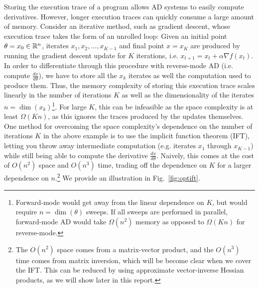 \documentclass[11pt]{article}
\begin{document}
Storing the execution trace of a program allows AD systems to easily compute derivatives.
However, longer execution traces can quickly consume a large amount of memory.
Consider an iterative method, such as gradient descent,
whose execution trace takes the form of an unrolled loop:
Given an initial point $\theta = x_0\in\mathbb{R}^n$,
iterates $x_1, x_2, ..., x_{K-1}$ and final point $x=x_K$
are produced by running the gradient descent
update for $K$ iterations, i.e. $x_{t+1} = x_{t} + \alpha \nabla f(x_t)$.
In order to differentiate through this procedure with reverse-mode AD
(i.e. compute $\frac{dx}{d\theta}$),
we have to store all the $x_k$ iterates
as well the computation used to produce them.
Thus, the memory complexity of storing this execution trace scales linearly in the
number of iterations $K$ as well as the dimensionality of the iterates $n=\dim(x_k)$\footnote{
Forward-mode would get away from the linear dependence on $K$,
but would require $n=\dim(\theta)$ sweeps.
If all sweeps are performed in parallel,
forward-mode AD would take $\Omega(n^2)$ memory as opposed to $\Omega(Kn)$ for reverse-mode.
}.
For large $K$, this can be infeasible as the space complexity is at least $\Omega(Kn)$,
as this ignores the traces produced by the updates themselves.
One method for overcoming the space complexity's dependence on the number of iterations $K$ in
the above example is to use the implicit function theorem (IFT),
letting you throw away intermediate computation (e.g. iterates $x_1$ through $x_{K-1}$)
while still being able to compute the derivative $\frac{dx}{d\theta}$.
Naively, this comes at the cost of $O(n^2)$ space and $O(n^3)$ time,
trading off the dependence on $K$ for a larger dependence on $n$.\footnote{
The $O(n^2)$ space comes from a matrix-vector product,
and the $O(n^3)$ time comes from matrix inversion,
which will be become clear when we cover the IFT.
This can be reduced by using approximate vector-inverse Hessian products,
as we will show later in this report.
}
We provide an illustration in Fig.~\ref{fig:optift}.
\end{document}
